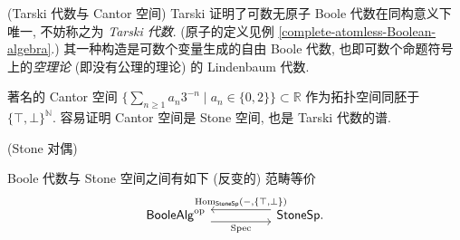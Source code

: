 \begin{example}
	{(Tarski 代数与 Cantor 空间)}
	Tarski 证明了可数无原子 Boole 代数在同构意义下唯一, 不妨称之为 \emph{Tarski 代数}. (原子的定义见例 \ref{complete-atomless-Boolean-algebra}.) 其一种构造是可数个变量生成的自由 Boole 代数, 也即可数个命题符号上的\emph{空理论} (即没有公理的理论) 的 Lindenbaum 代数.
	
	著名的 Cantor 空间 $\big\{\sum_{n\geq 1}a_n3^{-n}\mid a_n\in\{0,2\}\big\}\subset \mathbb{R}$ 作为拓扑空间同胚于 $\{\top,\bot\}^{\mathbb{N}}$. 容易证明 Cantor 空间是 Stone 空间, 也是 Tarski 代数的谱.
\end{example}

\begin{prop}
	[label={Stone-duality}]
	{(Stone 对偶)}
	
	Boole 代数与 Stone 空间之间有如下 (反变的) 范畴等价
	\[\begin{tikzcd}[ampersand replacement=\&]
		{\mathsf {BooleAlg}^{\op}} \&\& {\mathsf {StoneSp}.}
		\arrow["{\operatorname{Spec}}"', shift right=2, from=1-1, to=1-3]
		\arrow["{\operatorname{Hom}_{\mathsf {StoneSp}}(-,\{\top,\bot\})}"', shift right=2, from=1-3, to=1-1]
	\end{tikzcd}\]
\end{prop}

